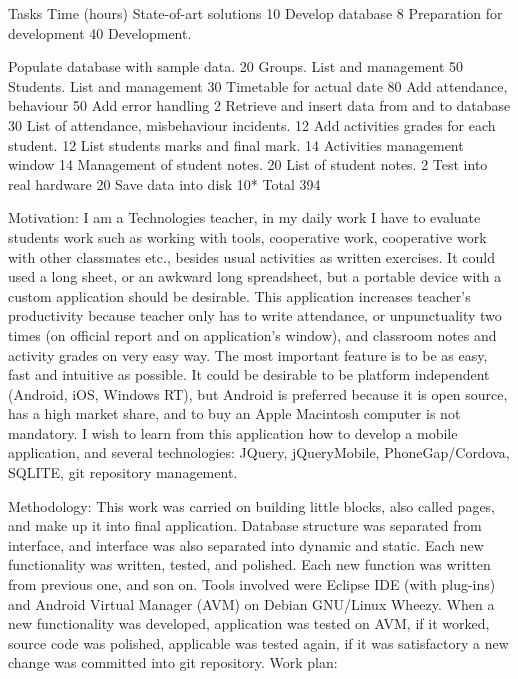Tasks
Time  (hours)
State-of-art solutions
10
Develop database
8
Preparation for development
40
Development.

	Populate database with sample data.
20
	Groups. List and management
50
	Students. List and management
30
	Timetable for actual date
80
	Add attendance, behaviour
50
	Add error handling
2
	Retrieve and insert data from and to database
30
	List of attendance, misbehaviour incidents.
12
	Add activities grades for each student.
12
	List students marks and final mark.
14
	Activities management window 
14
	Management of student notes.
20
	List of student notes. 
2
Test into real hardware
20
Save data into disk
10*
Total
394

Motivation:
	I am a Technologies teacher, in my daily work I have to evaluate students work such as working with tools, cooperative work, cooperative work with other classmates etc., besides usual activities as written exercises. It could used a long sheet, or an awkward long spreadsheet, but a portable device with a custom application should be desirable.
	This application increases teacher's productivity because teacher only has to write attendance, or unpunctuality two times (on official report and on application's window), and classroom notes and activity grades on very easy way.
	The most important feature is to be as easy, fast and intuitive as possible. It could be desirable to be platform independent (Android, iOS, Windows RT), but Android is preferred because it is open source, has a high market share, and to buy an Apple Macintosh computer is not mandatory.
	I wish to learn from this application how to develop a mobile application, and several technologies: JQuery,  jQueryMobile, PhoneGap/Cordova, SQLITE, git repository management.

Methodology:
	This work was carried on building little blocks, also called pages, and make up it into final application. Database structure was separated from interface, and interface was also separated into dynamic and static. Each new functionality was written, tested, and polished. Each new function was written from previous one, and son on.
	Tools involved were Eclipse IDE (with plug-ins) and Android Virtual Manager (AVM) on Debian GNU/Linux Wheezy. When a new functionality was developed, application was tested on AVM,  if it worked, source code was polished, applicable was tested again, if it was satisfactory a new change was committed into git repository. 
Work plan:


